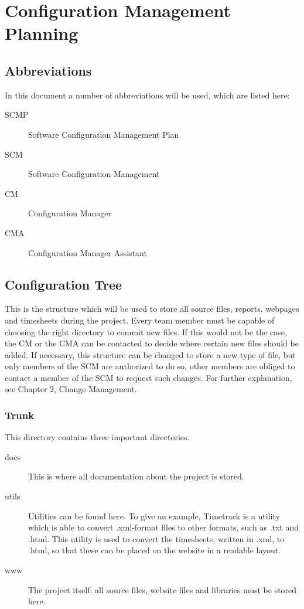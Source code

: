 \chapter{Configuration Management Planning}

\section{Abbreviations}
In this document a number of abbreviations will be used, which are listed here:
\begin{description}
\item[SCMP]
Software Configuration Management Plan
\item[SCM]
Software Configuration Management
\item[CM]
Configuration Manager
\item[CMA]
Configuration Manager Assistant
\end{description}

\section{Configuration Tree}
This is the structure which will be used to store all source files, reports, webpages and timesheets during the project.
Every team member must be capable of choosing the right directory to commit new files.
If this would not be the case, the CM or the CMA can be contacted to decide where certain new files should be added.
If necessary, this structure can be changed to store a new type of file, but only members of the SCM are authorized to do so, other members are obliged to contact a member of the SCM to request such changes.
For further explanation, see Chapter 2, Change Management.

\subsection{Trunk}
This directory contains three important directories.
\begin{description}
\item[docs]
This is where all documentation about the project is stored.
\item[utils]
Utilities can be found here.
To give an example, Timetrack is a utility which is able to convert .xml-format files to other formats, such as .txt and .html.
This utility is used to convert the timesheets, written in .xml, to .html, so that these can be placed on the website in a readable layout.
\item[www]
The project itself: all source files, website files and libraries must be stored here.
\end{description}

